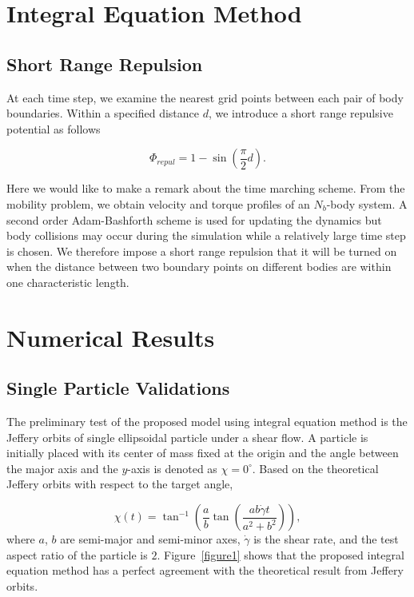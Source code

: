 \documentclass[lineno]{jfm}
\begin{document}
\section{\label{IEM}Integral Equation Method}



\subsection{Short Range Repulsion}

At each time step, we examine the nearest grid points between each pair of body  boundaries. Within a specified distance $d$, we introduce a short range repulsive potential as follows

\begin{equation}
\Phi_{repul} = 1- \sin\left(\frac{\pi}{2} d\right).
\end{equation}

Here we would like to make a remark about the time marching scheme. From the mobility problem, we obtain velocity and torque profiles of an $N_b$-body system. A second order Adam-Bashforth scheme is used for updating the dynamics but body collisions may occur during the simulation while a relatively large time step is chosen. We therefore impose a short range repulsion that it will be turned on when the distance between two boundary points on different bodies are within one characteristic length.


\section{\label{results}Numerical Results}

\subsection{Single Particle Validations}

The preliminary test of the proposed model using integral equation method is the Jeffery orbits of single ellipsoidal particle under a shear flow. A particle is initially placed with its center of mass fixed at the origin and the angle between the major axis and the $y$-axis is denoted as $\chi = 0^\circ$. Based on the theoretical Jeffery orbits with respect to the target angle, 

\begin{equation}
\chi(t) = \tan^{-1}\left(\frac{a}{b}\tan \left(\frac{ab \dot\gamma t}{a^2+b^2}\right)\right),
\end{equation}
%
where $a$, $b$ are semi-major and semi-minor axes, $\dot\gamma$ is the shear rate, and the test aspect ratio of the particle is $2$. Figure~\ref{figure1} shows that the proposed integral equation method has a perfect agreement with the theoretical result from Jeffery orbits.
\end{document}
